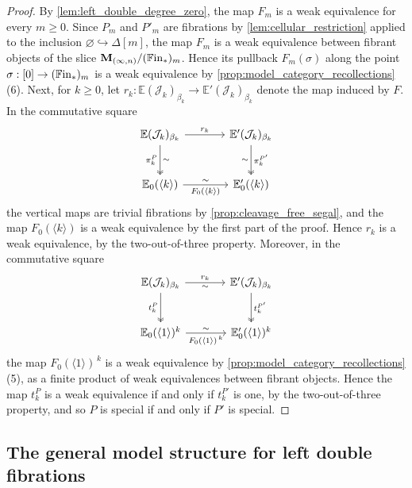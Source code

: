 \documentclass[10pt,reqno]{amsart}
\begin{document}
\begin{proof}
By \cref{lem:left_double_degree_zero}, the map $F_m$ is a weak
equivalence for every $m\geq0$. Since $P_m$ and $P'_m$ are
fibrations by \cref{lem:cellular_restriction} applied to the inclusion
$\varnothing\hookrightarrow\Delta[m]$, the map $F_m$ is a weak
equivalence between fibrant objects of the slice
$\mathbf M_{(\infty,n)}/(\mathbb{F}\mathrm{in}_*)_m$. Hence its pullback $F_m(\sigma)$ along the
point $\sigma:[0]\to(\mathbb{F}\mathrm{in}_*)_m$ is a weak equivalence by
\cref{prop:model_category_recollections}(6). Next, for $k\geq0$, let
$r_k:\mathbb E(\mathcal J_k)_{\beta_k}\to
\mathbb E'(\mathcal J_k)_{\beta_k}$ denote the map induced by $F$.
In the commutative square
\[
\begin{tikzcd}[ampersand replacement=\&, sep=large]
\mathbb E(\mathcal J_k)_{\beta_k}\arrow[r,"r_k"]
  \arrow[d,two heads,"\pi_k^P"',"\sim"]
\&\mathbb E'(\mathcal J_k)_{\beta_k}\arrow[d,two heads,"\pi_k^{P'}","\sim"']\\
\mathbb E_0(\langle k\rangle)
  \arrow[r,"F_0(\langle k\rangle)"',"\sim"]
\&\mathbb E'_0(\langle k\rangle)
\end{tikzcd}
\]
the vertical maps are trivial fibrations by
\cref{prop:cleavage_free_segal}, and the map $F_0(\langle k\rangle)$
is a weak equivalence by the first part of the proof. Hence $r_k$ is
a weak equivalence, by the two-out-of-three property. Moreover, in the
commutative square
\[
\begin{tikzcd}[ampersand replacement=\&, sep=large]
\mathbb E(\mathcal J_k)_{\beta_k}\arrow[r,"r_k","\sim"']\arrow[d,two heads,"t_k^P"']
\&\mathbb E'(\mathcal J_k)_{\beta_k}\arrow[d,two heads,"t_k^{P'}"]\\
\mathbb E_0(\langle1\rangle)^k
  \arrow[r,"F_0(\langle1\rangle)^{\,k}"',"\sim"]
\&\mathbb E'_0(\langle1\rangle)^k
\end{tikzcd}
\]
the map $F_0(\langle1\rangle)^{\,k}$ is a weak equivalence by
\cref{prop:model_category_recollections}(5), as a finite product of
weak equivalences between fibrant objects. Hence the map $t_k^P$ is
a weak equivalence if and only if $t_k^{P'}$ is one, by the
two-out-of-three property, and so $P$ is special if and only if
$P'$ is special.
\end{proof}

\subsection{The general model structure for left double fibrations}
\label{subsec:general_left_double_model_structure}
\end{document}

